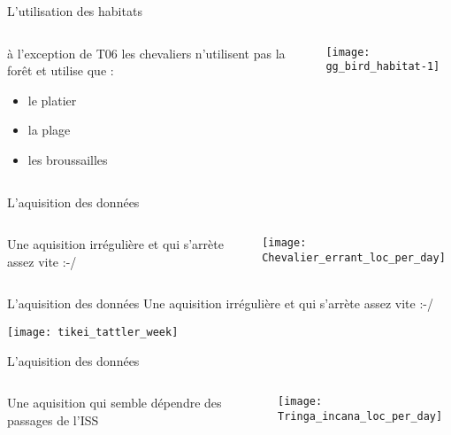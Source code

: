 \documentclass[10pt,compress]{beamer}
\begin{document}
\begin{frame}{L'utilisation des habitats}
   \begin{columns}
    \begin{column}[c]{0.4\textwidth}
      à l'exception de T06 les chevaliers n'utilisent pas la forêt et utilise que :
      \begin{itemize}
      \item le platier
      \item la plage
      \item les broussailles
      \end{itemize}
    \end{column}
    \begin{column}[c]{0.6\textwidth}
      \begin{center}
        \texttt{[image: gg\_bird\_habitat-1]}
      \end{center}
    \end{column}
  \end{columns}
\end{frame}


\begin{frame}{L'aquisition des données}
  \begin{columns}
    \begin{column}[c]{0.4\textwidth}
      Une aquisition irrégulière et qui s'arrète assez vite :-/
    \end{column}
    \begin{column}[c]{0.6\textwidth}
      \begin{center}
        \texttt{[image: Chevalier\_errant\_loc\_per\_day]}
      \end{center}
    \end{column}
  \end{columns}
\end{frame}


\begin{frame}{L'aquisition des données}
  Une aquisition irrégulière et qui s'arrète assez vite :-/
  \begin{center}
    \texttt{[image: tikei\_tattler\_week]}    
  \end{center}
\end{frame}


\begin{frame}{L'aquisition des données}
  \begin{columns}
    \begin{column}[c]{0.4\textwidth}
      Une aquisition qui semble dépendre des passages de l'ISS
    \end{column}
    \begin{column}[c]{0.6\textwidth}
      \begin{center}
        \texttt{[image: Tringa\_incana\_loc\_per\_day]}
      \end{center}
    \end{column}
  \end{columns}
\end{frame}
\end{document}
